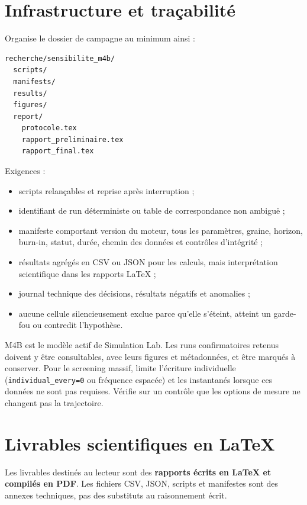 \documentclass[11pt,a4paper]{article}
\newcommand{\code}[1]{\texttt{\color{navy}#1}}
\newcommand{\term}[1]{\textbf{\color{navy}#1}}
\begin{document}
\section{Infrastructure et traçabilité}

Organise le dossier de campagne au minimum ainsi :

\begin{verbatim}
recherche/sensibilite_m4b/
  scripts/
  manifests/
  results/
  figures/
  report/
    protocole.tex
    rapport_preliminaire.tex
    rapport_final.tex
\end{verbatim}

Exigences :

\begin{itemize}
  \item scripts relançables et reprise après interruption ;
  \item identifiant de run déterministe ou table de correspondance non ambiguë ;
  \item manifeste comportant version du moteur, tous les paramètres, graine,
    horizon, burn-in, statut, durée, chemin des données et contrôles
    d'intégrité ;
  \item résultats agrégés en CSV ou JSON pour les calculs, mais interprétation
    scientifique dans les rapports LaTeX ;
  \item journal technique des décisions, résultats négatifs et anomalies ;
  \item aucune cellule silencieusement exclue parce qu'elle s'éteint, atteint
    un garde-fou ou contredit l'hypothèse.
\end{itemize}

M4B est le modèle actif de Simulation Lab. Les runs confirmatoires retenus
doivent y être consultables, avec leurs figures et métadonnées, et être marqués
à conserver. Pour le screening massif, limite l'écriture individuelle
(\code{individual\_every=0} ou fréquence espacée) et les instantanés lorsque
ces données ne sont pas requises. Vérifie sur un contrôle que les options de
mesure ne changent pas la trajectoire.

\section{Livrables scientifiques en LaTeX}

Les livrables destinés au lecteur sont des \term{rapports écrits en LaTeX et
compilés en PDF}. Les fichiers CSV, JSON, scripts et manifestes sont des annexes
techniques, pas des substituts au raisonnement écrit.
\end{document}
